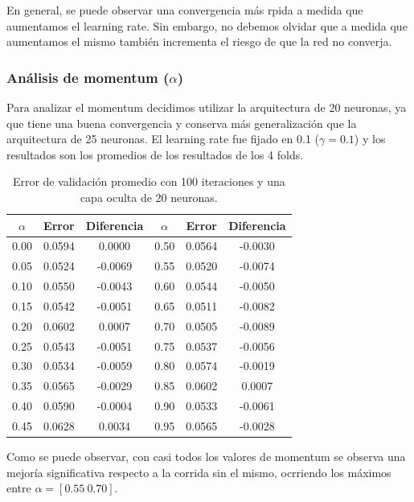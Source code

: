\documentclass[informe.tex]{subfiles}
\begin{document}
    En general, se puede observar una convergencia más rpida a medida que aumentamos el learning rate. Sin embargo, no debemos olvidar que a medida que aumentamos el mismo también incrementa el riesgo de que la red no converja.
    

    \subsubsection{An\'alisis de momentum ($\alpha$)}
    
    Para analizar el momentum decidimos utilizar la arquitectura de 20 neuronas, ya que tiene una buena convergencia y conserva más generalización que la arquitectura de 25 neuronas. El learning rate fue fijado en 0.1 ($\gamma = 0.1$) y los resultados son los promedios de los resultados de los 4 folds.
    
    \begin{table}[H]
      \begin{center}
	\begin{tabular}{|c|c|c|c|c|c|}
	\hline
	$\alpha$ & Error & Diferencia & $\alpha$ & Error & Diferencia  \\ 
	\hline
	0.00 & 0.0594 & 0.0000 & 0.50 & 0.0564 & -0.0030 \\
	\hline
	0.05 & 0.0524 & -0.0069 & 0.55 & 0.0520 & -0.0074 \\
	\hline
	0.10 & 0.0550 & -0.0043 & 0.60 & 0.0544 & -0.0050 \\
	\hline
	0.15 & 0.0542 & -0.0051 & 0.65 & 0.0511 & -0.0082 \\
	\hline
	0.20 & 0.0602 & 0.0007 & 0.70 & 0.0505 & -0.0089 \\
	\hline
	0.25 & 0.0543 & -0.0051 & 0.75 & 0.0537 & -0.0056 \\
	\hline
	0.30 & 0.0534 & -0.0059 & 0.80 & 0.0574 & -0.0019 \\
	\hline
	0.35 & 0.0565 & -0.0029 & 0.85 & 0.0602 & 0.0007 \\
	\hline
	0.40 & 0.0590 & -0.0004 & 0.90 & 0.0533 & -0.0061 \\
	\hline
	0.45 & 0.0628 & 0.0034 & 0.95 & 0.0565 & -0.0028 \\
	\hline
	\end{tabular}
	\caption{Error de validación promedio con 100 iteraciones y una capa oculta de 20 neuronas.}
	\label{tab:error-d1-f1}
      \end{center}
    \end{table}
    
    Como se puede observar, con casi todos los valores de momentum se observa una mejoría significativa respecto a la corrida sin el mismo, ocrriendo los máximos entre $\alpha = [0.55\ 0.70]$.
    
\end{document}
